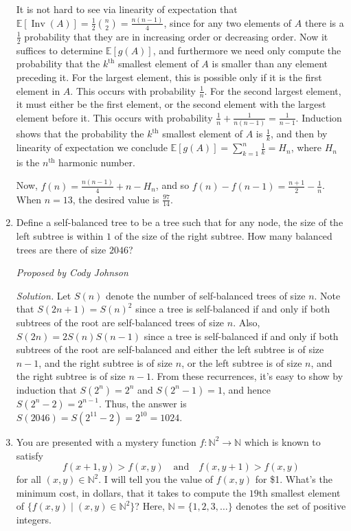 \documentclass[10pt]{article}
\newcommand{\proposed}[1]
{
\vspace{5pt}
\noindent\textit{Proposed by #1}
}
\newcommand{\solution}
{
\vspace{5pt}
\noindent\textit{Solution.}\qquad
}
\begin{document}
\begin{enumerate}
\par It is not hard to see via linearity of expectation that $\mathbb{E}[\operatorname{Inv}(A)] = \frac{1}{2} \binom{n}{2} = \frac{n(n-1)}{4}$, since for any two elements of $A$ there is a $\frac{1}{2}$ probability that they are in increasing order or decreasing order. Now it suffices to determine $\mathbb{E}[g(A)]$, and furthermore we need only compute the probability that the $k^{\text{th}}$ smallest element of $A$ is smaller than any element preceding it. For the largest element, this is possible only if it is the first element in $A$. This occurs with probability $\frac{1}{n}$. For the second largest element, it must either be the first element, or the second element with the largest element before it. This occurs with probability $\frac{1}{n} + \frac{1}{n(n-1)} = \frac{1}{n-1}$. Induction shows that the probability the $k^{\text{th}}$ smallest element of $A$ is $\frac{1}{k}$, and then by linearity of expectation we conclude $\mathbb{E}[g(A)] = \sum_{k=1}^{n} \frac{1}{k} = H_{n}$, where $H_{n}$ is the $n^{\text{th}}$ harmonic number.

\par Now, $f(n) = \frac{n(n-1)}{4} + n - H_{n}$, and so $f(n) - f(n-1) = \frac{n+1}{2} - \frac{1}{n}$. When $n = 13$, the desired value is $\boxed{\frac{97}{14}}$.



\item Define a self-balanced tree to be a tree such that for any node, the size of the left subtree is within $1$ of the size of the right subtree. How many balanced trees are there of size $2046$?

\proposed{Cody Johnson}

\solution Let $S(n)$ denote the number of self-balanced trees of size $n$. Note that $S(2n+1)=S(n)^2$ since a tree is self-balanced if and only if both subtrees of the root are self-balanced trees of size $n$. Also, $S(2n)=2S(n)S(n-1)$ since a tree is self-balanced if and only if both subtrees of the root are self-balanced and either the left subtree is of size $n-1$, and the right subtree is of size $n$, or the left subtree is of size $n$, and the right subtree is of size $n-1$. From these recurrences, it's easy to show by induction that $S(2^n)=2^n$ and $S(2^n-1)=1$, and hence $S(2^n-2)=2^{n-1}$. Thus, the answer is $S(2046)=S(2^{11}-2)=2^{10}=\boxed{1024}$.


\item You are presented with a mystery function $f:\mathbb N^2\to\mathbb N$ which is known to satisfy \[f(x+1,y)>f(x,y)\quad\text{and}\quad f(x,y+1)>f(x,y)\] for all $(x,y)\in\mathbb N^2$. I will tell you the value of $f(x,y)$ for \$1. What's the minimum cost, in dollars, that it takes to compute the $19$th smallest element of $\{f(x,y)\mid(x,y)\in\mathbb N^2\}$? Here, $\mathbb N=\{1,2,3,\dots\}$ denotes the set of positive integers.


\end{enumerate}
\end{document}
